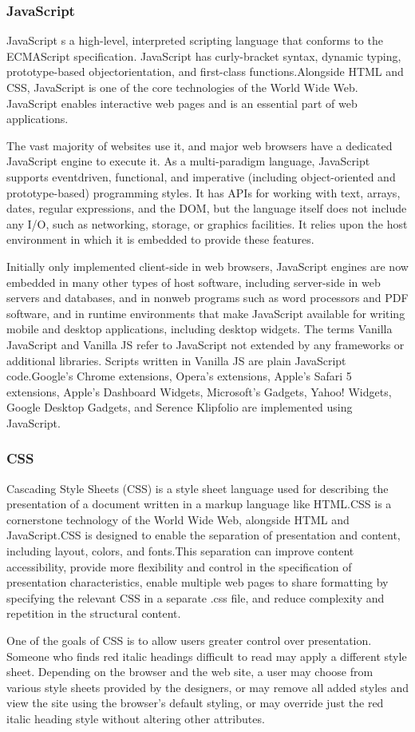 \documentclass[12pt, a4paper]{report}
\begin{document}
\subsubsection{JavaScript}
JavaScript s a high-level, interpreted scripting language that conforms to the ECMAScript
specification. JavaScript has curly-bracket syntax, dynamic typing, prototype-based objectorientation,
and first-class functions.Alongside HTML and CSS, JavaScript is one of the core
technologies of the World Wide Web. JavaScript enables interactive web pages and is an essential
part of web applications.\par The vast majority of websites use it, and major web browsers have a
dedicated JavaScript engine to execute it. As a multi-paradigm language, JavaScript supports eventdriven,
functional, and imperative (including object-oriented and prototype-based) programming
styles. It has APIs for working with text, arrays, dates, regular expressions, and the DOM, but the
language itself does not include any I/O, such as networking, storage, or graphics facilities. It relies
upon the host environment in which it is embedded to provide these features.
\par Initially only implemented client-side in web browsers, JavaScript engines are now embedded in
many other types of host software, including server-side in web servers and databases, and in nonweb
programs such as word processors and PDF software, and in runtime environments that make
JavaScript available for writing mobile and desktop applications, including desktop widgets.
The terms Vanilla JavaScript and Vanilla JS refer to JavaScript not extended by any frameworks or
additional libraries. Scripts written in Vanilla JS are plain JavaScript code.Google's Chrome
extensions, Opera's extensions, Apple's Safari 5 extensions, Apple's Dashboard Widgets, Microsoft's
Gadgets, Yahoo! Widgets, Google Desktop Gadgets, and Serence Klipfolio are implemented using
JavaScript.

\subsubsection{CSS}
Cascading Style Sheets (CSS) is a style sheet language used for describing the presentation of a
document written in a markup language like HTML.CSS is a cornerstone technology of the World
Wide Web, alongside HTML and JavaScript.CSS is designed to enable the separation of
presentation and content, including layout, colors, and fonts.This separation can improve content
accessibility, provide more flexibility and control in the specification of presentation characteristics,
enable multiple web pages to share formatting by specifying the relevant CSS in a separate .css file,
and reduce complexity and repetition in the structural content.
\par One of the goals of CSS is to allow users greater control over presentation. Someone who finds red
italic headings difficult to read may apply a different style sheet. Depending on the browser and the
web site, a user may choose from various style sheets provided by the designers, or may remove all
added styles and view the site using the browser's default styling, or may override just the red italic
heading style without altering other attributes.
\end{document}
